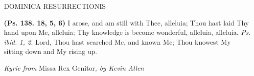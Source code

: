 \documentclass[11pt]{article} %
\begin{document}
\begin{center}\begin{huge}\textsc{DOMINICA RESURRECTIONIS}\end{huge}\end{center}


\def\greinitialformat#1{%
{\fontsize{34}{34}\selectfont #1}%
}




\vskip20pt

\def\greinitialformat#1{%
{\fontsize{34}{34}\selectfont #1}%
}




\textbf{(Ps. 138. 18, 5, 6)} I arose, and am still with Thee, alleluia; Thou hast laid Thy hand upon Me, alleluia; Thy knowledge is become wonderful, alleluia, alleluia. \emph{Ps. ibid. 1, 2.} Lord, Thou hast searched Me, and known Me; Thou knowest My sitting down and My rising up.

\vskip10pt

\emph{Kyrie from} Missa Rex Genitor\emph{, by Kevin Allen}
\end{document}
